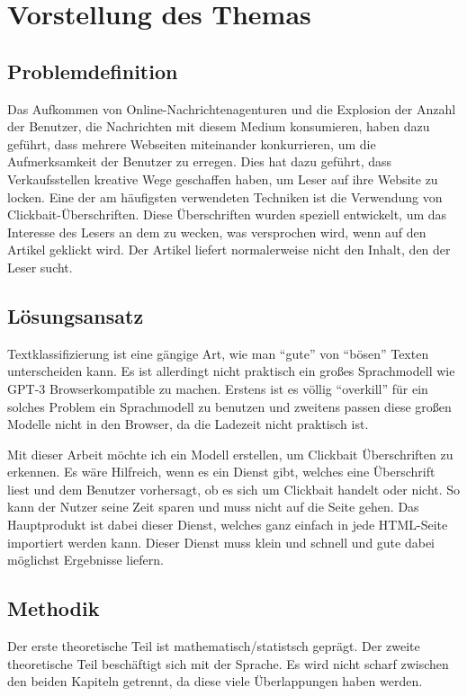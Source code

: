 \chapter{Vorstellung des Themas}
\section{Problemdefinition}
Das Aufkommen von Online-Nachrichtenagenturen und die Explosion der Anzahl der Benutzer, die Nachrichten mit diesem Medium konsumieren, haben dazu geführt, dass mehrere Webseiten miteinander konkurrieren, um die Aufmerksamkeit der Benutzer zu erregen. Dies hat dazu geführt, dass Verkaufsstellen kreative Wege geschaffen haben, um Leser auf ihre Website zu locken. Eine der am häufigsten verwendeten Techniken ist die Verwendung von Clickbait-Überschriften. Diese Überschriften wurden speziell entwickelt, um das Interesse des Lesers an dem zu wecken, was versprochen wird, wenn auf den Artikel geklickt wird. Der Artikel liefert normalerweise nicht den Inhalt, den der Leser sucht. 

\section{Lösungsansatz}
Textklassifizierung ist eine gängige Art, wie man \enquote{gute} von \enquote{bösen} Texten unterscheiden kann. Es ist allerdingt nicht praktisch ein großes Sprachmodell wie GPT-3 Browserkompatible zu machen. Erstens ist es völlig \enquote{overkill} für ein solches Problem ein Sprachmodell zu benutzen und zweitens passen diese großen Modelle nicht in den Browser, da die Ladezeit nicht praktisch ist.

Mit dieser Arbeit möchte ich ein Modell erstellen, um Clickbait Überschriften zu erkennen. Es wäre Hilfreich, wenn es ein Dienst gibt, welches eine Überschrift liest und dem Benutzer vorhersagt, ob es sich um Clickbait handelt oder nicht. So kann der Nutzer seine Zeit sparen und muss nicht auf die Seite gehen. Das Hauptprodukt ist dabei dieser Dienst, welches ganz einfach in jede HTML-Seite importiert werden kann. Dieser Dienst muss klein und schnell und gute dabei möglichst Ergebnisse liefern.

\section{Methodik}

Der erste theoretische Teil ist mathematisch/statistsch geprägt. Der zweite theoretische Teil beschäftigt sich mit der Sprache. Es wird nicht scharf zwischen den beiden Kapiteln getrennt, da diese viele Überlappungen haben werden.


